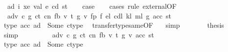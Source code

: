 \begin{isabellebody}
\ {\isacharparenleft}{\kern0pt}{}\ ad{\isacharprime}{\kern0pt}\ i\ xe\ val\ e\ cd\ st{\isacharparenright}{\kern0pt}\isanewline
\ \ \isamarkupfalse%
\ {\isacharquery}{\kern0pt}case\isanewline
\ \ \isamarkupfalse%
\ {\isacharparenleft}{\kern0pt}cases\ rule{\isacharcolon}{\kern0pt}\ external{\isacharbrackleft}{\kern0pt}OF\ {}{\isacharparenleft}{\kern0pt}{}{\isacharparenright}{\kern0pt}{\isacharbrackright}{\kern0pt}{\isacharparenright}{\kern0pt}\isanewline
\ \ \ \ \isamarkupfalse%
\ {\isacharparenleft}{\kern0pt}{}\ adv\ c\ g\ ct\ cn\ fb{\isacharprime}{\kern0pt}\ v\ t\ g{\isacharprime}{\kern0pt}\ v{\isacharprime}{\kern0pt}\ fp\ f\ e\isactrlsub l\ cd\isactrlsub l\ k\isactrlsub l\ m\isactrlsub l\ g{\isacharprime}{\kern0pt}{\isacharprime}{\kern0pt}\ acc\ st{\isacharprime}{\kern0pt}{\isacharprime}{\kern0pt}{\isacharparenright}{\kern0pt}\isanewline
\ \ \ \ \isamarkupfalse%
\ \isamarkupfalse%
\ {}{\isacharparenleft}{\kern0pt}{}{\isacharparenright}{\kern0pt}\ \isamarkupfalse%
\ {\isachardoublequoteopen}type\ {\isacharparenleft}{\kern0pt}acc\ ad{\isacharparenright}{\kern0pt}\ {\isacharequal}{\kern0pt}\ Some\ ctype{\isachardoublequoteclose}\ \isamarkupfalse%
\ transfer{\isacharunderscore}{\kern0pt}type{\isacharunderscore}{\kern0pt}same{\isacharbrackleft}{\kern0pt}OF\ {}{\isacharparenleft}{\kern0pt}{}{}{\isacharparenright}{\kern0pt}{\isacharbrackright}{\kern0pt}\ \isamarkupfalse%
\ simp\isanewline
\ \ \ \ \isamarkupfalse%
\ \isamarkupfalse%
\ {\isacharquery}{\kern0pt}thesis\ \isamarkupfalse%
\ {}{\isacharparenleft}{\kern0pt}{}{\isacharparenright}{\kern0pt}\ \isamarkupfalse%
\ simp\isanewline
\ \ \isamarkupfalse%
\isanewline
\ \ \ \ \isamarkupfalse%
\ {\isacharparenleft}{\kern0pt}{}\ adv\ c\ g\ ct\ cn\ fb{\isacharprime}{\kern0pt}\ v\ t\ g{\isacharprime}{\kern0pt}\ v{\isacharprime}{\kern0pt}\ acc\ st{\isacharprime}{\kern0pt}{\isacharprime}{\kern0pt}{\isacharparenright}{\kern0pt}\isanewline
\ \ \ \ \isamarkupfalse%
\ \isamarkupfalse%
\ {}{\isacharparenleft}{\kern0pt}{}{\isacharparenright}{\kern0pt}\ \isamarkupfalse%
\ {\isachardoublequoteopen}type\ {\isacharparenleft}{\kern0pt}acc\ ad{\isacharparenright}{\kern0pt}\ {\isacharequal}{\kern0pt}\ Some\ ctype{\isachardoublequoteclose}\ \isamarkupfalse%

\end{isabellebody}
